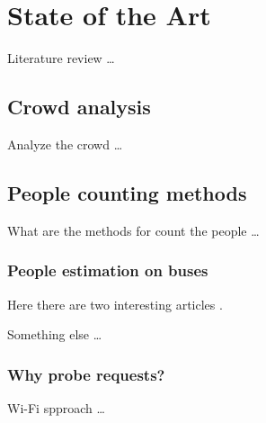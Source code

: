 \chapter{State of the Art}
\label{cha:soa}
\vspace{0.5 cm} 

Literature review \dots


\vspace{0.5 cm} 
\section{Crowd analysis}
\label{sec:crowd}
\vspace{0.5 cm} 

Analyze the crowd \dots


\vspace{0.5 cm} 
\section{People counting methods}
\label{sec:count}
\vspace{0.5 cm} 

What are the methods for count the people \dots


\vspace{0.5 cm} 
\subsection{People estimation on buses}
\label{sec:bus}
\vspace{0.5 cm}

Here there are two interesting articles
\cite{nishide2019filter} \cite{mikkelsen2016public}.


Something else \cite{mehmood2019occupancy} \dots


\vspace{0.5 cm} 
\subsection{Why probe requests?}
\label{sec:probe}
\vspace{0.5 cm}

Wi-Fi spproach \dots
